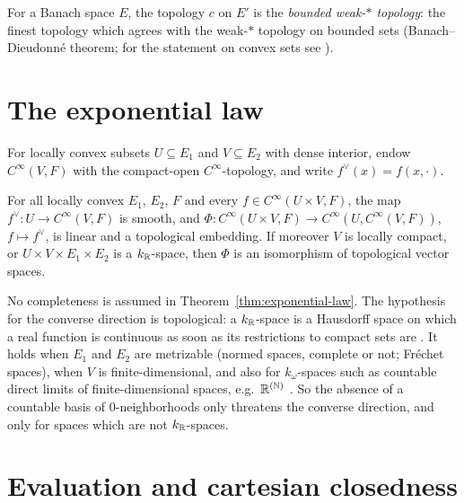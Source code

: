 For a Banach space $E$, the topology $c$ on $E'$ is the \emph{bounded weak-$*$ topology}: the
finest topology which agrees with the weak-$*$ topology on bounded sets (Banach--Dieudonné
theorem; for the statement on convex sets see \cite[Thm.~4.44]{FHHMPZ01}).

\section{The exponential law}

For locally convex subsets $U \subseteq E_1$ and $V \subseteq E_2$ with dense interior, endow
$C^\infty(V, F)$ with the compact-open $C^\infty$-topology, and write
$f^\vee(x) = f(x, \cdot)$.

\begin{theorem}
  \label{thm:exponential-law}
  For all locally convex $E_1$, $E_2$, $F$ and every $f \in C^\infty(U \times V, F)$, the map
  $f^\vee \colon U \to C^\infty(V, F)$ is smooth, and
  $\Phi \colon C^\infty(U \times V, F) \to C^\infty(U, C^\infty(V, F))$, $f \mapsto f^\vee$, is
  linear and a topological embedding. If moreover $V$ is locally compact, or
  $U \times V \times E_1 \times E_2$ is a $k_{\mathbb{R}}$-space, then $\Phi$ is an isomorphism of
  topological vector spaces.
\end{theorem}

\begin{remark}
  \label{rem:exponential-law-completeness}
  No completeness is assumed in Theorem~\ref{thm:exponential-law}. The hypothesis for the
  converse direction is topological: a $k_{\mathbb{R}}$-space is a Hausdorff space on which a real
  function is continuous as soon as its restrictions to compact sets are
  \cite[Rem.~A.6.15]{GN26}. It holds when $E_1$ and $E_2$ are metrizable (normed spaces,
  complete or not; Fréchet spaces), when $V$ is finite-dimensional, and also for
  $k_\omega$-spaces such as countable direct limits of finite-dimensional spaces, e.g.\
  $\mathbb{R}^{(\mathbb{N})}$ \cite[Rem.~4.1.22, Prop.~A.7.20]{GN26}. So the absence of a countable basis of
  $0$-neighborhoods only threatens the converse direction, and only for spaces which are not
  $k_{\mathbb{R}}$-spaces.
\end{remark}

\section{Evaluation and cartesian closedness}

